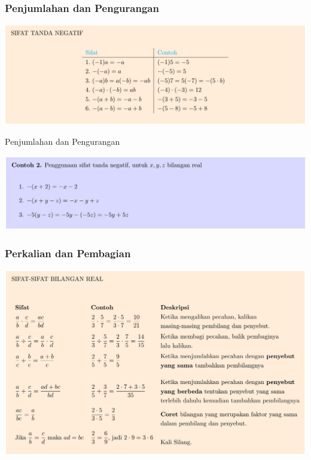 \documentclass[pdflatex,compress,mathserif]{beamer}
\begin{document}
\begin{frame}
	\frametitle{Penjumlahan dan Pengurangan}
	\begin{center}
		\includegraphics[width=\linewidth]{img/img07}
	\end{center}
\end{frame}

\begin{frame}{Penjumlahan dan Pengurangan}
	\begin{center}
		\includegraphics[width=\linewidth]{img/img08}
	\end{center}
\end{frame}

\begin{frame}
	\frametitle{Perkalian dan Pembagian}
	\begin{center}
		\includegraphics[width=\linewidth]{img/img09}
	\end{center}
\end{frame}
\end{document}
